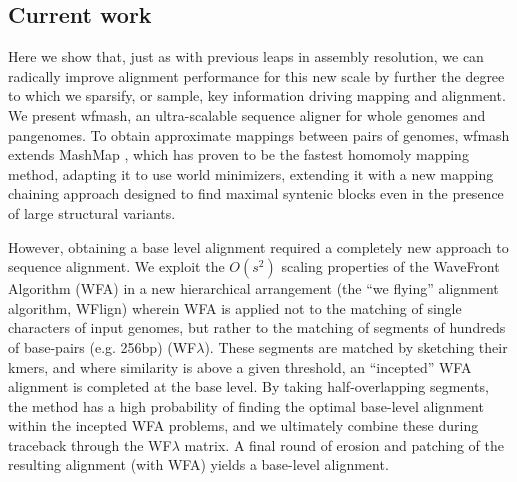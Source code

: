 \documentclass{bioinfo}
\theoremstyle{definition}
\begin{document}

\subsection{Current work}

Here we show that, just as with previous leaps in assembly resolution, we can radically improve alignment performance for this new scale by further the degree to which we sparsify, or sample, key information driving mapping and alignment.
We present wfmash, an ultra-scalable sequence aligner for whole genomes and pangenomes.
To obtain approximate mappings between pairs of genomes, wfmash extends MashMap \citep{Jain_2018}, which has proven to be the fastest homomoly mapping method, adapting it to use world minimizers, extending it with a new mapping chaining approach designed to find maximal syntenic blocks even in the presence of large structural variants.

However, obtaining a base level alignment required a completely new approach to sequence alignment.
We exploit the $O(s^2)$ scaling properties of the WaveFront Algorithm (WFA) \citep{Marco_Sola_2020} in a new hierarchical arrangement (the ``we flying'' alignment algorithm, WFlign) wherein WFA is applied not to the matching of single characters of input genomes, but rather to the matching of segments of hundreds of base-pairs (e.g. 256bp) (WF$\lambda$).
These segments are matched by sketching their kmers, and where similarity is above a given threshold, an ``incepted'' WFA alignment is completed at the base level.
By taking half-overlapping segments, the method has a high probability of finding the optimal base-level alignment within the incepted WFA problems, and we ultimately combine these during traceback through the WF$\lambda$ matrix.
A final round of erosion and patching of the resulting alignment (with WFA) yields a base-level alignment.
\end{document}
